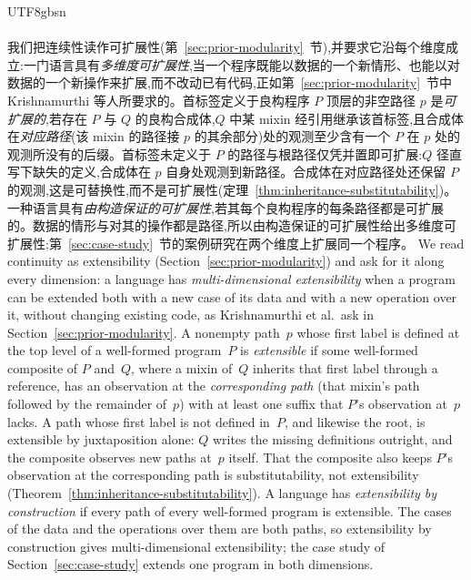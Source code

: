 \begin{CJK*}{UTF8}{gbsn}
\paragraph{}
\ifPaperChinese
我们把连续性读作可扩展性(第~\ref{sec:prior-modularity}~节),并要求它沿每个维度成立:一门语言具有\emph{多维度可扩展性},当一个程序既能以数据的一个新情形、也能以对数据的一个新操作来扩展,而不改动已有代码,正如第~\ref{sec:prior-modularity}~节中 Krishnamurthi 等人所要求的。首标签定义于良构程序 $P$ 顶层的非空路径 $p$ 是\emph{可扩展的},若存在 $P$ 与 $Q$ 的良构合成体,$Q$ 中某 mixin 经引用继承该首标签,且合成体在\emph{对应路径}(该 mixin 的路径接 $p$ 的其余部分)处的观测至少含有一个 $P$ 在 $p$ 处的观测所没有的后缀。首标签未定义于 $P$ 的路径与根路径仅凭并置即可扩展:$Q$ 径直写下缺失的定义,合成体在 $p$ 自身处观测到新路径。合成体在对应路径处还保留 $P$ 的观测,这是可替换性,而不是可扩展性(定理~\ref{thm:inheritance-substitutability})。一种语言具有\emph{由构造保证的可扩展性},若其每个良构程序的每条路径都是可扩展的。数据的情形与对其的操作都是路径,所以由构造保证的可扩展性给出多维度可扩展性;第~\ref{sec:case-study}~节的案例研究在两个维度上扩展同一个程序。
\else
We read continuity as extensibility (Section~\ref{sec:prior-modularity}) and ask for it along every dimension: a language has \emph{multi-dimensional extensibility} when a
program can be extended both with a new case of its data and with a new operation over it, without
changing existing code, as Krishnamurthi et al.\ ask in Section~\ref{sec:prior-modularity}.
A nonempty path~$p$ whose first label is defined at the top level of a well-formed program~$P$ is
\emph{extensible} if some well-formed composite of $P$ and~$Q$, where a mixin of~$Q$ inherits that
first label through a reference, has an observation at the \emph{corresponding path} (that mixin's path
followed by the remainder of~$p$) with at least one suffix that $P$'s observation at~$p$ lacks. A path
whose first label is not defined in~$P$, and likewise the root, is extensible by juxtaposition alone:
$Q$ writes the missing definitions outright, and the composite observes new paths at~$p$ itself. That
the composite also keeps $P$'s observation at the corresponding path is substitutability, not
extensibility (Theorem~\ref{thm:inheritance-substitutability}). A language has \emph{extensibility by
construction} if every path of every well-formed program is extensible. The cases of the data and the
operations over them are both paths, so extensibility by construction gives multi-dimensional
extensibility; the case study of
Section~\ref{sec:case-study} extends one program in both dimensions.
\fi


\end{CJK*}
